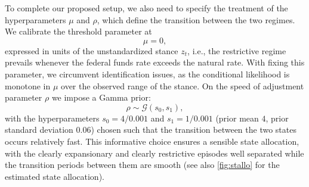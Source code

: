 To complete our proposed setup, we also need to specify the treatment of the hyperparameters $\mu$ and $\rho$, which define the transition between the two regimes.
We calibrate the threshold parameter at
\begin{equation*}
    \mu = 0,
\end{equation*}
expressed in units of the unstandardized stance $z_t$, i.e., the restrictive regime prevails whenever the federal funds rate exceeds the natural rate. With fixing this parameter, we circumvent identification issues, as the conditional likelihood is monotone in $\mu$ over the observed range of the stance. %
On the speed of adjustment parameter $\rho$ we impose a Gamma prior:
\begin{equation*}
    \rho \sim \mathcal{G}(s_0, s_1),
\end{equation*}
with the hyperparameters $s_0=4/0.001$ and $s_1=1/0.001$ (prior mean $4$, prior standard deviation $0.06$) chosen such that the transition between the two states occurs relatively fast. This informative choice ensures a sensible state allocation, with the clearly expansionary and clearly restrictive episodes well separated while the transition periods between them are smooth (see also \autoref{fig:stallo} for the estimated state allocation). %

